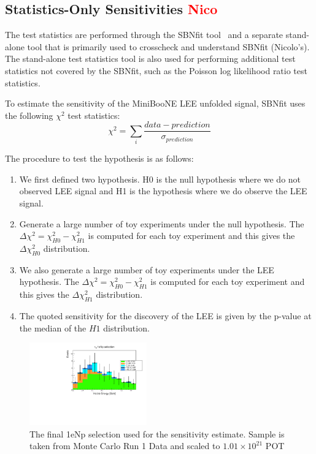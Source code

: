 \documentclass[a4paper]{article}
\begin{document}
\subsection{Statistics-Only Sensitivities \textcolor{red}{Nico}}
\label{subsec:teststats}

The test statistics are performed through the SBNfit tool~\cite{bib:sbnfit20437} and a separate stand-alone tool that is primarily used to crosscheck and understand SBNfit (Nicolo's). The stand-alone test statistics tool is also used for performing additional test statistics not covered by the SBNfit, such as the Poisson log likelihood  ratio test statistics.

To estimate the sensitivity of the MiniBooNE LEE unfolded signal, SBNfit uses the following $\chi^2$ test statistics:
\begin{equation}
\chi^2 = \sum_{i} \frac{data - prediction}{\sigma_{prediction}}
\end{equation}

The procedure to test the hypothesis is as follows:
\begin{enumerate}
    \item We first defined two hypothesis. H0 is the null hypothesis where we do not observed LEE signal and H1 is the hypothesis where we do observe the LEE signal. 
    \item Generate a large number of toy experiments under the null hypothesis. The $\Delta \chi^2 = \chi^2_{H0} - \chi^2_{H1}$ is computed for each toy experiment and this gives the $\Delta \chi^2_{H0}$ distribution.
    \item We also generate a large number of toy experiments under the LEE hypothesis. The $\Delta \chi^2 = \chi^2_{H0} - \chi^2_{H1}$ is computed for each toy experiment and this gives the $\Delta \chi^2_{H1}$ distribution.
    \item The quoted sensitivity for the discovery of the LEE is given by the p-value at the median of the $H1$ distribution.
\end{enumerate}

\begin{figure}[H]
\begin{center}
\includegraphics[width=0.45\textwidth]{Sensitivity/nue_reco_e_genietune_run1_nueStacked.pdf}
\caption{\label{fig:1eNp:box:sensitivitysample} The final 1eNp selection used for the sensitivity estimate. Sample is taken from Monte Carlo Run 1 Data and scaled to $1.01\times10^{21}$ POT}
\end{center}
\end{figure}
\end{document}

